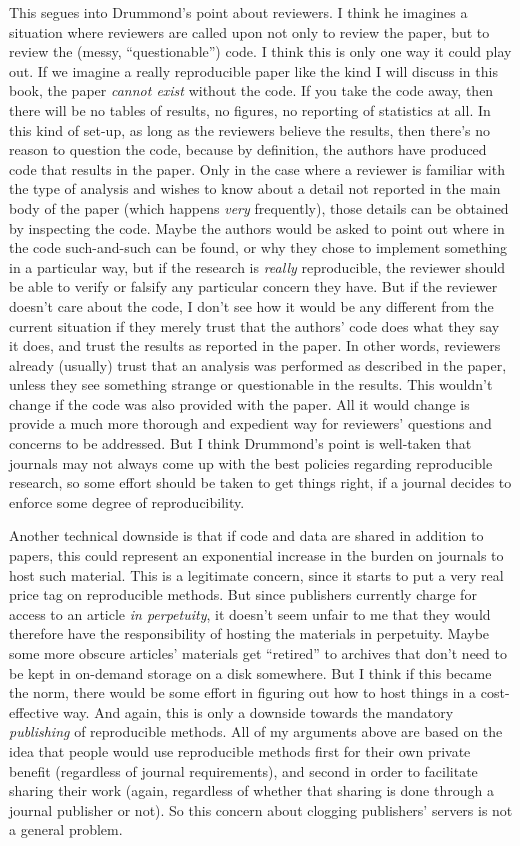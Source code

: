 \documentclass{book}
\begin{document}
This segues into Drummond's point about reviewers. I think he imagines a situation where reviewers are called upon not only to review the paper, but to review the (messy, ``questionable'') code. I think this is only one way it could play out. If we imagine a really reproducible paper like the kind I will discuss in this book, the paper \emph{cannot exist} without the code. If you take the code away, then there will be no tables of results, no figures, no reporting of statistics at all.  In this kind of set-up, as long as the reviewers believe the results, then there's no reason to question the code, because by definition, the authors have produced code that results in the paper. Only in the case where a reviewer is familiar with the type of analysis and wishes to know about a detail not reported in the main body of the paper (which happens \emph{very} frequently), those details can be obtained by inspecting the code. Maybe the authors would be asked to point out where in the code such-and-such can be found, or why they chose to implement something in a particular way, but if the research is \emph{really} reproducible, the reviewer should be able to verify or falsify any particular concern they have.  But if the reviewer doesn't care about the code, I don't see how it would be any different from the current situation if they merely trust that the authors' code does what they say it does, and trust the results as reported in the paper. In other words, reviewers already (usually) trust that an analysis was performed as described in the paper, unless they see something strange or questionable in the results. This wouldn't change if the code was also provided with the paper. All it would change is provide a much more thorough and expedient way for reviewers' questions and concerns to be addressed.  But I think Drummond's point is well-taken that journals may not always come up with the best policies regarding reproducible research, so some effort should be taken to get things right, if a journal decides to enforce some degree of reproducibility.

Another technical downside is that if code and data are shared in addition to papers, this could represent an exponential increase in the burden on journals to host such material. This is a legitimate concern, since it starts to put a very real price tag on reproducible methods.  But since publishers currently charge for access to an article \emph{in perpetuity}, it doesn't seem unfair to me that they would therefore have the responsibility of hosting the materials in perpetuity.  Maybe some more obscure articles' materials get ``retired'' to archives that don't need to be kept in on-demand storage on a disk somewhere.  But I think if this became the norm, there would be some effort in figuring out how to host things in a cost-effective way.  And again, this is only a downside towards the mandatory \emph{publishing} of reproducible methods.  All of my arguments above are based on the idea that people would use reproducible methods first for their own private benefit (regardless of journal requirements), and second in order to facilitate sharing their work (again, regardless of whether that sharing is done through a journal publisher or not). So this concern about clogging publishers' servers is not a general problem.
\end{document}
